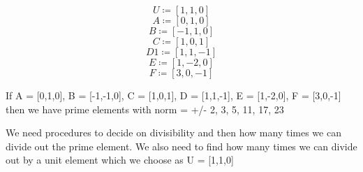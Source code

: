 \documentclass{article}
\begin{document}
\begin{dmath*}
U \coloneqq \left[1,1,0\right]
\end{dmath*}
\vspace{-\bigskipamount}
\begin{dmath*}
A \coloneqq \left[0,1,0\right]
\end{dmath*}
\vspace{-\bigskipamount}
\begin{dmath*}
B \coloneqq \left[-1,1,0\right]
\end{dmath*}
\vspace{-\bigskipamount}
\begin{dmath*}
C \coloneqq \left[1,0,1\right]
\end{dmath*}
\vspace{-\bigskipamount}
\begin{dmath*}
\mathit{D1} \coloneqq \left[1,1,-1\right]
\end{dmath*}
\vspace{-\bigskipamount}
\begin{dmath*}
E \coloneqq \left[1,-2,0\right]
\end{dmath*}
\vspace{-\bigskipamount}
\begin{dmath}\label{(8)}
F \coloneqq \left[3,0,-1\right]
\end{dmath}
\begin{Maple Normal}

\end{Maple Normal}
\begin{Maple Normal}

\end{Maple Normal}
\begin{Maple Normal}
If A = [0,1,0], B = [-1,-1,0], C = [1,0,1], D = [1,1,-1], E = [1,-2,0], F = [3,0,-1] then we have prime elements with norm = +/-  2, 3, 5, 11, 17, 23
\end{Maple Normal}
\begin{Maple Normal}

\end{Maple Normal}
\begin{Maple Normal}
We need procedures to decide on divisibility and then how many times we can divide out the prime element. We also need to find how many times we can divide out by a unit element which we choose as U = [1,1,0]
\end{Maple Normal}
\begin{Maple Normal}

\end{Maple Normal}
\end{document}
